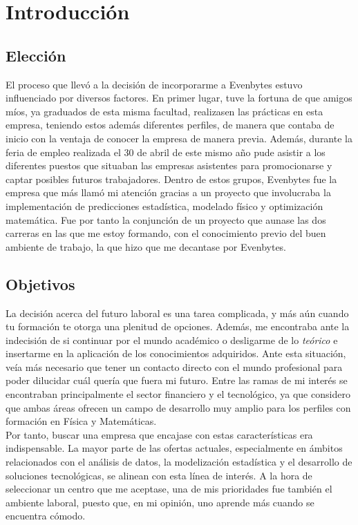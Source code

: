 \chapter{Introducción}
%
%
\section{Elección} \label{eleccion}
%
%
El proceso que llevó a la decisión de incorporarme a Evenbytes estuvo influenciado por diversos factores. En primer lugar, tuve la fortuna de que amigos míos, ya graduados de esta misma facultad, realizasen las prácticas en esta empresa, teniendo estos además diferentes perfiles, de manera que contaba de inicio con la ventaja de conocer la empresa de manera previa. Además, durante la feria de empleo realizada el 30 de abril de este mismo año pude asistir a los diferentes puestos que situaban las empresas asistentes para promocionarse y captar posibles futuros trabajadores. Dentro de estos grupos, Evenbytes fue la empresa que más llamó mi atención gracias a un proyecto que involucraba la implementación de predicciones estadística, modelado físico y optimización matemática. Fue por tanto la conjunción de un proyecto que aunase las dos carreras en las que me estoy formando, con el conocimiento previo del buen ambiente de trabajo, la que hizo que me decantase por Evenbytes.
%
%
\section{Objetivos} \label{objetivos}
%
%
La decisión acerca del futuro laboral es una tarea complicada, y más aún cuando tu formación te otorga una plenitud de opciones. Además, me encontraba ante la indecisión de si continuar por el mundo académico o desligarme de lo \textit{teórico} e insertarme en la aplicación de los conocimientos adquiridos. Ante esta situación, veía más necesario que tener un contacto directo con el mundo profesional para poder dilucidar cuál quería que fuera mi futuro. Entre las ramas de mi interés se encontraban principalmente el sector financiero y el tecnológico, ya que considero que ambas áreas ofrecen un campo de desarrollo muy amplio para los perfiles con formación en Física y Matemáticas.\\

Por tanto, buscar una empresa que encajase con estas características era indispensable. La mayor parte de las ofertas actuales, especialmente en ámbitos relacionados con el análisis de datos, la modelización estadística y el desarrollo de soluciones tecnológicas, se alinean con esta línea de interés. A la hora de seleccionar un centro que me aceptase, una de mis prioridades fue también el ambiente laboral, puesto que, en mi opinión, uno aprende más cuando se encuentra cómodo.\\

